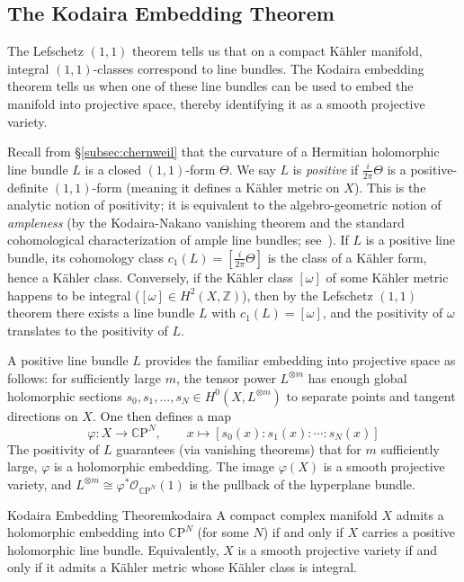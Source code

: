\documentclass{article}
\newcommand{\Z}{{\mathbb{Z}}}
\newcommand{\CO}{\mathcal{O}}
\newcommand{\CP}{\mathbb{C}\mathrm{P}}
\renewcommand{\phi}{\varphi}
\begin{document}
\subsection{The Kodaira Embedding Theorem}\label{subsec:kodaira}

The Lefschetz $(1,1)$ theorem tells us that on a compact K\"{a}hler manifold,
integral $(1,1)$-classes correspond to line bundles. The Kodaira embedding
theorem tells us when one of these line bundles can be used to embed the
manifold into projective space, thereby identifying it as a smooth projective
variety.

Recall from \S\ref{subsec:chernweil} that the curvature of a Hermitian holomorphic line bundle $L$ is a closed
$(1,1)$-form $\Theta$. We say $L$ is \emph{positive} if $\frac{i}{2\pi}\Theta$ is a positive-definite
$(1,1)$-form (meaning it defines a K\"{a}hler metric on $X$). This is the analytic notion of positivity; it is
equivalent to the algebro-geometric notion of \emph{ampleness} (by the Kodaira-Nakano vanishing theorem and
the standard cohomological characterization of ample line bundles; see~\cite{NateAlgGeo}). If $L$ is a
positive line bundle, its cohomology class $c_1(L) = [\frac{i}{2\pi}\Theta]$ is the class of a K\"{a}hler
form, hence a K\"{a}hler class. Conversely, if the K\"{a}hler class $[\omega]$ of some K\"{a}hler metric
happens to be integral ($[\omega] \in H^2(X, \Z)$), then by the Lefschetz $(1,1)$ theorem there exists a line
bundle $L$ with $c_1(L) = [\omega]$, and the positivity of $\omega$ translates to the positivity of $L$.

A positive line bundle $L$ provides the familiar embedding into projective space as follows: for sufficiently
large $m$, the tensor power $L^{\otimes m}$ has enough global holomorphic
sections $s_0, s_1, \ldots, s_N \in H^0(X, L^{\otimes m})$ to separate points
and tangent directions on $X$. One then defines a map
\[
  \phi: X \longrightarrow \CP^N, \qquad
    x \longmapsto [s_0(x) : s_1(x) : \cdots : s_N(x)]
\]
The positivity of $L$ guarantees (via vanishing theorems) that for $m$
sufficiently large, $\phi$ is a holomorphic embedding. The image $\phi(X)$ is a
smooth projective variety, and $L^{\otimes m} \cong \phi^*\CO_{\CP^N}(1)$ is
the pullback of the hyperplane bundle.

\begin{thm}{Kodaira Embedding Theorem}{kodaira}
  A compact complex manifold $X$ admits a holomorphic embedding into $\CP^N$
  (for some $N$) if and only if $X$ carries a positive holomorphic line bundle.
  Equivalently, $X$ is a smooth projective variety if and only if it admits a
  K\"{a}hler metric whose K\"{a}hler class is integral.
\end{thm}
\end{document}
